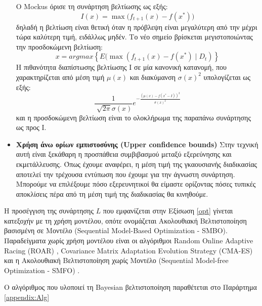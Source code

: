 \begin{itemize}
 		O Mockus όρισε τη συνάρτηση βελτίωσης ως εξής:
 		\begin{equation}
 		I(x)= \max \Big( f_{t+1} (x) - f(x^*) \Big)
 		\end{equation}
 		δηλαδή η βελτίωση είναι θετική όταν η πρόβλεψη είναι μεγαλύτερη από την μέχρι τώρα καλύτερη τιμή, ειδάλλως μηδέν. Το νέο σημείο βρίσκεται μεγιστοποιώντας την προσδοκώμενη βελτίωση:
 		\begin{equation}
 		x=argmax \left \{ E( \max( f_{t+1}(x) - f(x^*) \mid D_t) \right \}
 		\end{equation}
 		H πιθανότητα διαπίστωσης βελτίωσης I σε μία κανονική κατανομή, που χαρακτηρίζεται από μέση τιμή $\mu(x)$ και διακύμανση $\sigma(x)^2$ υπολογίζεται ως εξής:
 		\begin{equation}\frac{1}{\sqrt[]{2 \pi} \sigma(x)} e^{- \frac{(\mu(x)- f(x^*-I))^2}{\sigma(x)^2}}
 		\end{equation} 
 		και η προσδοκώμενη βελτίωση είναι το ολοκλήρωμα της παραπάνω συνάρτησης ως προς I.
 		\item \textbf{Χρήση άνω ορίων εμπιστοσύνης (Upper confidence bounds)} Στην τεχνική αυτή είναι ξεκάθαρη η προσπάθεια συμβιβασμού μεταξύ εξερεύνησης και εκμετάλλευσης. Όπως έχουμε αναφέρει, η μέση τιμή της γκαουσιανής διαδικασίας αποτελεί την τρέχουσα εντύπωση που έχουμε για την άγνωστη συνάρτηση. Μπορούμε να επιλέξουμε πόσο εξερευνητικοί θα είμαστε ορίζοντας πόσες τυπικές αποκλίσεις πέρα από τη μέση τιμή της διαδικασίας θα κινηθούμε.
 	\end{itemize} 	
 	
 	Η προσέγγιση της συνάρτησης $L$ που εμφανίζεται στην Εξίσωση \ref{opt} γίνεται κατεξοχήν με τη χρήση μοντέλου, οπότε ονομάζεται Ακολουθιακή Βελτιστοποίηση βασισμένη σε Μοντέλο (Sequential Model-Based Optimization - \gls{SMBO}). Παραδείγματα χωρίς χρήση μοντέλου είναι οι αλγόριθμοι Random Online Adaptive Racing (ROAR) \citep{Hutter2011}, Covari\-ance Matrix Adaptation Evolution Strategy (CMA-ES) \citep{DBLP:journals/corr/LoshchilovH16} και η Ακολουθιακή Βελτιστοποίηση χωρίς Μοντέλο (Sequential Model-free Optimization - \gls{SMFO})  \citep{7373431}. 
 	
 	
 Ο αλγόριθμος που υλοποιεί τη Bayesian βελτιστοποίηση παραθέτεται στο Παράρτημα \ref{appendix:Alg}
